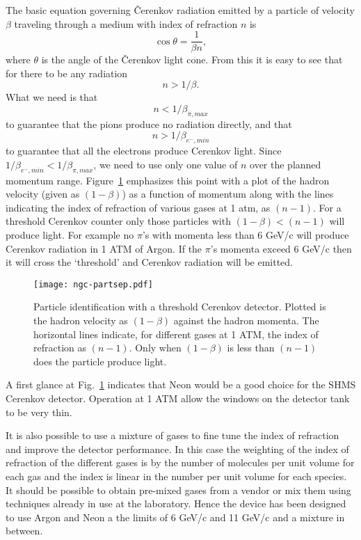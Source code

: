 {The basic equation  governing \v Cerenkov radiation emitted by a particle
of velocity $\beta$ traveling through a medium with index of refraction
$n$ is \begin{equation}\cos \theta = \frac{1}{\beta n},\end{equation}
where $\theta$ is the angle of the \v Cerenkov light cone.
From this it is easy to see that for there to be any radiation
$$n > 1/\beta.$$ What we need is that
\begin{equation} n < 1/\beta_{\pi,max}\label{eq:index} \end{equation}
to guarantee that the pions produce no radiation directly, and that
\begin{equation} n > 1/\beta_{e^-,min} \end{equation}
to guarantee that all the electrons produce Cerenkov light. Since
$1/\beta_{e^-,min} < 1/\beta_{\pi,max}$, we need to use only one value
of $n$ over the planned momentum range. Figure~\ref{fig:partsep}
emphasizes this point with a plot of the hadron velocity (given as
$(1-\beta)$) as a function of momentum along with the lines indicating
the index of refraction of various gases at 1 atm, as $(n-1)$.  For a
threshold Cerenkov counter only those particles with $(1-\beta) <
(n-1)$ will produce light. For example no $\pi$'s with momenta less
than 6 GeV/c will produce Cerenkov radiation in 1 ATM of Argon. If the
$\pi$'s momenta exceed 6 GeV/c then it will cross the `threshold' and
Cerenkov radiation will be emitted.
 \begin{figure}[!h] %
   \centering
   \texttt{[image: ngc-partsep.pdf]}
   \caption{Particle identification with a threshold Cerenkov
     detector. Plotted is the hadron velocity as $(1-\beta)$ against
     the hadron momenta. The horizontal lines indicate, for different
     gases at 1 ATM, the index of refraction as $(n-1)$. Only when
     $(1-\beta)$ is less than $(n-1)$ does the particle produce
     light.}
   \label{fig:partsep}
\end{figure}
A first glance at Fig.~\ref{fig:partsep} indicates that Neon would be
a good choice for the SHMS Cerenkov detector. Operation at 1 ATM allow
the windows on the detector tank to be very thin.

It is also possible to use a mixture of gases to fine tune the index
of refraction and improve the detector performance. In this case the
weighting of the index of refraction of the different gases is by the
number of molecules per unit volume for each gas and the index is
linear in the number per unit volume for each species. It should be
possible to obtain pre-mixed gases from a vendor or mix them using
techniques already in use at the laboratory. Hence the device has been
designed to use Argon and Neon a the limits of 6 GeV/c and 11 GeV/c
and a mixture in between.


}
